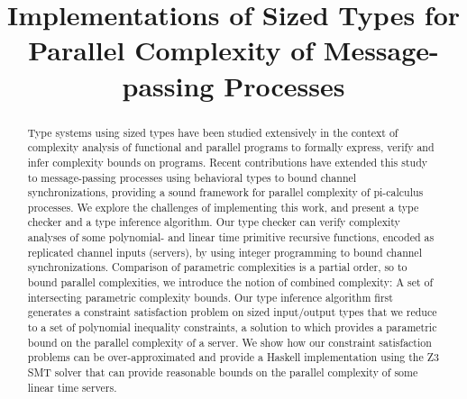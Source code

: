\documentclass{llncs}
\title{Implementations of Sized Types for Parallel Complexity of
  Message-passing Processes}
\begin{document}
\maketitle

\begin{abstract}
%
Type systems using sized types have been studied extensively in the
context of complexity analysis of functional and parallel programs to
formally express, verify and infer complexity bounds on
programs. Recent contributions have extended this study to
message-passing processes using behavioral types to bound channel
synchronizations, providing a sound framework for parallel complexity
of pi-calculus processes. We explore the challenges of implementing
this work, and present a type checker and a type inference
algorithm. Our type checker can verify complexity analyses of some
polynomial- and linear time primitive recursive functions, encoded as
replicated channel inputs (servers), by using integer programming to
bound channel synchronizations. Comparison of parametric complexities
is a partial order, so to bound parallel complexities, we introduce
the notion of combined complexity: A set of intersecting parametric
complexity bounds. Our type inference algorithm first generates a
constraint satisfaction problem on sized input/output types that we
reduce to a set of polynomial inequality constraints, a solution to
which provides a parametric bound on the parallel complexity of a
server. We show how our constraint satisfaction problems can be
over-approximated and provide a Haskell implementation using the Z3
SMT solver that can provide reasonable bounds on the parallel
complexity of some linear time servers. 
\end{abstract}

\thispagestyle{empty}




\end{document}
